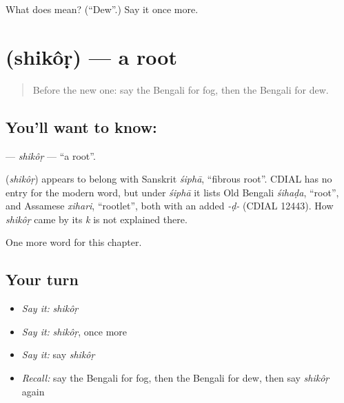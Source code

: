 \begin{tcolorbox}[breakable,colback=teal!4,colframe=teal!35!black,title={Before you move on}]
What does  mean? (\textquotedblleft{}Dew\textquotedblright{}.) Say it once more.
\end{tcolorbox}
\section[\texorpdfstring{\bn{শিকড়} (shikôṛ)}{শিকড় (shikôṛ)}]{ (shikôṛ) — a root}

\label{lesson:BN-C114-shikor}



\begin{quote}
Before the new one: say the Bengali for fog, then the Bengali for dew.
\end{quote}

\subsection*{You'll want to know: }
\textbf{} — \emph{shikôṛ} — \textquotedblleft{}a root\textquotedblright{}.

\begin{cousinweb}
\textbf{} (\emph{shikôṛ}) appears to belong with Sanskrit \emph{śiphā}, \textquotedblleft{}fibrous root\textquotedblright{}. CDIAL has no entry for the modern word, but under \emph{śiphā} it lists Old Bengali \emph{śihaḍa}, \textquotedblleft{}root\textquotedblright{}, and Assamese \emph{xihari}, \textquotedblleft{}rootlet\textquotedblright{}, both with an added \emph{-ḍ-} (CDIAL 12443). How \emph{shikôṛ} came by its \emph{k} is not explained there.
\end{cousinweb}

\begin{grammarlens}[title={What you've built}]
One more word for this chapter.
\end{grammarlens}

\subsection*{Your turn}
\begin{itemize}
\raggedright
  \item \emph{Say it:} \emph{shikôṛ}
  \item \emph{Say it:} \emph{shikôṛ}, once more
  \item \emph{Say it:} say \emph{shikôṛ}
  \item \emph{Recall:} say the Bengali for fog, then the Bengali for dew, then say \emph{shikôṛ} again
\end{itemize}

